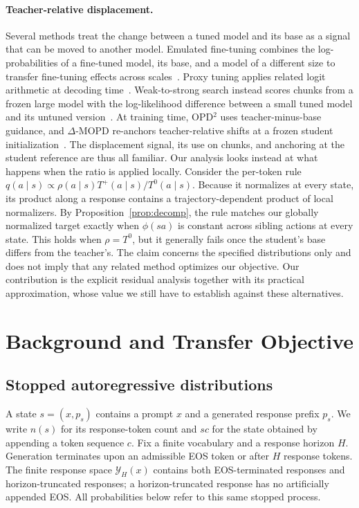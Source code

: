 \documentclass[pdflatex,sn-mathphys-num,review]{sn-jnl}
\theoremstyle{thmstyleone}
\theoremstyle{thmstyletwo}
\theoremstyle{thmstylethree}
\providecommand{\Tp}{T^{+}}
\providecommand{\Tz}{T^{0}}
\providecommand{\Yset}{\mathcal{Y}}
\begin{document}
\paragraph{Teacher-relative displacement.}
Several methods treat the change between a tuned model and its base as a signal that can be moved to another model. Emulated fine-tuning combines the log-probabilities of a fine-tuned model, its base, and a model of a different size to transfer fine-tuning effects across scales~\citep{mitchell2024emulator}. Proxy tuning applies related logit arithmetic at decoding time~\citep{liu2024tuning}. Weak-to-strong search instead scores chunks from a frozen large model with the log-likelihood difference between a small tuned model and its untuned version~\citep{zhou2024weak}. At training time, OPD$^2$ uses teacher-minus-base guidance, and $\Delta$-MOPD re-anchors teacher-relative shifts at a frozen student initialization~\citep{heo2026opd,sang2026composing}. The displacement signal, its use on chunks, and anchoring at the student reference are thus all familiar. Our analysis looks instead at what happens when the ratio is applied locally. Consider the per-token rule $q(a\mid s)\propto\rho(a\mid s)\Tp(a\mid s)/\Tz(a\mid s)$. Because it normalizes at every state, its product along a response contains a trajectory-dependent product of local normalizers. By Proposition~\ref{prop:decomp}, the rule matches our globally normalized target exactly when $\phi(sa)$ is constant across sibling actions at every state. This holds when $\rho=\Tz$, but it generally fails once the student's base differs from the teacher's. The claim concerns the specified distributions only and does not imply that any related method optimizes our objective. Our contribution is the explicit residual analysis together with its practical approximation, whose value we still have to establish against these alternatives.

\section{Background and Transfer Objective}
\label{sec:background}

\subsection{Stopped autoregressive distributions}
\label{subsec:bg-notation}
A state $s=(x,p_s)$ contains a prompt $x$ and a generated response prefix $p_s$. We write $n(s)$ for its response-token count and $sc$ for the state obtained by appending a token sequence $c$. Fix a finite vocabulary and a response horizon $H$. Generation terminates upon an admissible EOS token or after $H$ response tokens. The finite response space $\Yset_H(x)$ contains both EOS-terminated responses and horizon-truncated responses; a horizon-truncated response has no artificially appended EOS. All probabilities below refer to this same stopped process.
\end{document}
